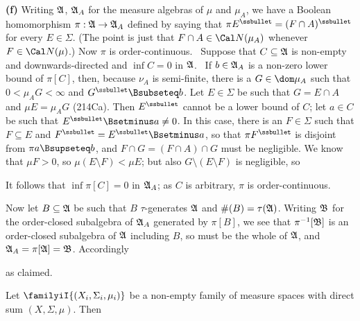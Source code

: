 {

\medskip

{\bf (f)} Writing $\frak A$, $\frak A_A$ for the measure algebras of
$\mu$ and $\mu_A$, we have a Boolean homomorphism
$\pi:\frak A\to\frak A_A$ defined by saying that
$\pi E^{\ssbullet}=(F\cap A)^{\ssbullet}$ for every $E\in\Sigma$.
(The point is just that $F\cap A\in\Cal N(\mu_A)$ whenever
$F\in\Cal N(\mu)$.)   Now $\pi$ is order-continuous.   \Prf\ Suppose that
$C\subseteq\frak A$ is non-empty and downwards-directed and
$\inf C=0$ in $\frak A$.   \Quer\ If
$b\in\frak A_A$ is a non-zero lower bound of $\pi[C]$, then, because
$\nu_A$ is semi-finite, there is a $G\in\dom\mu_A$ such that
$0<\mu_AG<\infty$ and $G^{\ssbullet}\Bsubseteq b$.   Let $E\in\Sigma$ be
such that $G=E\cap A$ and $\mu E=\mu_AG$ (214Ca).   Then $E^{\ssbullet}$
cannot be a lower bound of $C$;  let $a\in C$ be such that
$E^{\ssbullet}\Bsetminus a\ne 0$.   In this case, there is an $F\in\Sigma$
such that $F\subseteq E$ and
$F^{\ssbullet}=E^{\ssbullet}\Bsetminus a$, so that
$\pi F^{\ssbullet}$ is disjoint from $\pi a\Bsupseteq b$, and
$F\cap G=(F\cap A)\cap G$ must be negligible.   We know that $\mu F>0$,
so $\mu(E\setminus F)<\mu E$;  but also $G\setminus(E\setminus F)$ is
negligible, so


\noindent It follows that $\inf\pi[C]=0$ in $\frak A_A$;  as
$C$ is arbitrary, $\pi$ is order-continuous.\ \Qed

Now let $B\subseteq\frak A$ be such that $B\,\,\tau$-generates $\frak A$
and $\#(B)=\tau(\frak A)$.   Writing $\frak B$ for the
order-closed subalgebra of $\frak A_A$ generated by $\pi[B]$,
we see that $\pi^{-1}[\frak B]$ is an order-closed subalgebra of
$\frak A$ including $B$, so must be the whole of $\frak A$, and
$\frak A_A=\pi[\frak A]=\frak B$.   Accordingly


\noindent as claimed.
}%

 Let $\familyiI{(X_i,\Sigma_i,\mu_i)}$ be a
non-empty
family of measure spaces with direct sum $(X,\Sigma,\mu)$.   Then



